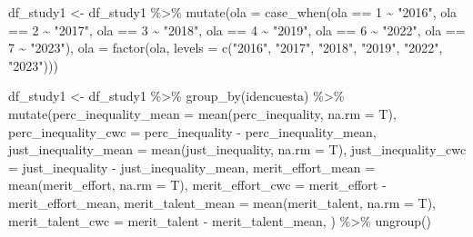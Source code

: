 \documentclass[
  12pt,
  letterpaper,
  DIV=11,
  numbers=noendperiod]{scrartcl}
\newenvironment{Shaded}{\begin{snugshade}}{\end{snugshade}}
\newcommand{\AttributeTok}[1]{\textcolor[rgb]{0.40,0.45,0.13}{#1}}
\newcommand{\DecValTok}[1]{\textcolor[rgb]{0.68,0.00,0.00}{#1}}
\newcommand{\FunctionTok}[1]{\textcolor[rgb]{0.28,0.35,0.67}{#1}}
\newcommand{\NormalTok}[1]{\textcolor[rgb]{0.00,0.23,0.31}{#1}}
\newcommand{\OtherTok}[1]{\textcolor[rgb]{0.00,0.23,0.31}{#1}}
\newcommand{\SpecialCharTok}[1]{\textcolor[rgb]{0.37,0.37,0.37}{#1}}
\newcommand{\StringTok}[1]{\textcolor[rgb]{0.13,0.47,0.30}{#1}}
\begin{document}
\begin{Shaded}
\begin{Highlighting}[]
\NormalTok{df\_study1 }\OtherTok{\textless{}{-}}\NormalTok{ df\_study1 }\SpecialCharTok{\%\textgreater{}\%} 
  \FunctionTok{mutate}\NormalTok{(}\AttributeTok{ola =} \FunctionTok{case\_when}\NormalTok{(ola }\SpecialCharTok{==} \DecValTok{1} \SpecialCharTok{\textasciitilde{}} \StringTok{"2016"}\NormalTok{,}
\NormalTok{                         ola }\SpecialCharTok{==} \DecValTok{2} \SpecialCharTok{\textasciitilde{}} \StringTok{"2017"}\NormalTok{,}
\NormalTok{                         ola }\SpecialCharTok{==} \DecValTok{3} \SpecialCharTok{\textasciitilde{}} \StringTok{"2018"}\NormalTok{,}
\NormalTok{                         ola }\SpecialCharTok{==} \DecValTok{4} \SpecialCharTok{\textasciitilde{}} \StringTok{"2019"}\NormalTok{,}
\NormalTok{                         ola }\SpecialCharTok{==} \DecValTok{6} \SpecialCharTok{\textasciitilde{}} \StringTok{"2022"}\NormalTok{,}
\NormalTok{                         ola }\SpecialCharTok{==} \DecValTok{7} \SpecialCharTok{\textasciitilde{}} \StringTok{"2023"}\NormalTok{),}
         \AttributeTok{ola =} \FunctionTok{factor}\NormalTok{(ola, }\AttributeTok{levels =} \FunctionTok{c}\NormalTok{(}\StringTok{"2016"}\NormalTok{,}
                                        \StringTok{"2017"}\NormalTok{,}
                                        \StringTok{"2018"}\NormalTok{,}
                                        \StringTok{"2019"}\NormalTok{,}
                                        \StringTok{"2022"}\NormalTok{,}
                                        \StringTok{"2023"}\NormalTok{)))}


\NormalTok{df\_study1 }\OtherTok{\textless{}{-}}\NormalTok{ df\_study1 }\SpecialCharTok{\%\textgreater{}\%} 
  \FunctionTok{group\_by}\NormalTok{(idencuesta) }\SpecialCharTok{\%\textgreater{}\%} 
  \FunctionTok{mutate}\NormalTok{(}\AttributeTok{perc\_inequality\_mean =} \FunctionTok{mean}\NormalTok{(perc\_inequality, }\AttributeTok{na.rm =}\NormalTok{ T),}
         \AttributeTok{perc\_inequality\_cwc =}\NormalTok{ perc\_inequality }\SpecialCharTok{{-}}\NormalTok{ perc\_inequality\_mean,}
         \AttributeTok{just\_inequality\_mean =} \FunctionTok{mean}\NormalTok{(just\_inequality, }\AttributeTok{na.rm =}\NormalTok{ T),}
         \AttributeTok{just\_inequality\_cwc =}\NormalTok{ just\_inequality }\SpecialCharTok{{-}}\NormalTok{ just\_inequality\_mean,}
         \AttributeTok{merit\_effort\_mean =} \FunctionTok{mean}\NormalTok{(merit\_effort, }\AttributeTok{na.rm =}\NormalTok{ T),}
         \AttributeTok{merit\_effort\_cwc =}\NormalTok{ merit\_effort }\SpecialCharTok{{-}}\NormalTok{ merit\_effort\_mean,}
         \AttributeTok{merit\_talent\_mean =} \FunctionTok{mean}\NormalTok{(merit\_talent, }\AttributeTok{na.rm =}\NormalTok{ T),}
         \AttributeTok{merit\_talent\_cwc =}\NormalTok{ merit\_talent }\SpecialCharTok{{-}}\NormalTok{ merit\_talent\_mean,}
\NormalTok{         ) }\SpecialCharTok{\%\textgreater{}\%} 
  \FunctionTok{ungroup}\NormalTok{()}
\end{Highlighting}
\end{Shaded}
\end{document}
